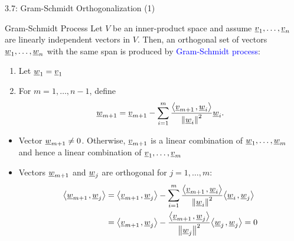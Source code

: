 \documentclass[10pt,english,aspectratio=169]{beamer}
\begin{document}
\begin{frame}{3.7: Gram-Schmidt Orthogonalization (1)}

\vspace{-2mm}

\begin{block}{Gram-Schmidt Process}
Let $V$ be an inner-product space and assume $\underline{v}_1, \ldots, \underline{v}_n$ are linearly independent vectors in $V$.
Then, an orthogonal set of vectors $\underline{w}_1, \ldots, \underline{w}_n$ with the same span is produced by \textcolor{blue}{Gram-Schmidt process}:
\begin{enumerate}
\item Let $\underline{w}_1 = \underline{v}_1$

\item For $m=1,\ldots,n-1$, define \vspace{-4.5mm}
\begin{equation*}
\underline{w}_{m+1} = \underline{v}_{m+1} - \sum_{i=1}^m \frac{ {\left\langle  \underline{v}_{m+1}  \mskip2mu ,  \underline{w}_i  \right\rangle} } { \left\| \underline{w}_i \right\|^2 } \underline{w}_i.
\end{equation*}
\end{enumerate}
\end{block}

\vspace{-0,5mm}
\begin{itemize}
\setlength\itemsep{1.5mm}
\item<2-> Vector $\underline{w}_{m+1} \neq 0$. Otherwise, $\underline{v}_{m+1}$ is a linear combination of $\underline{w}_1, \ldots, \underline{w}_m$ and hence a linear combination of $\underline{v}_1, \ldots, \underline{v}_m$

\item<3-> Vectors $\underline{w}_{m+1}$ and $\underline{w}_j$ are orthogonal for $j=1,\ldots,m$: \vspace{-1.5mm}
\begin{equation*}
\begin{split}
{\left\langle  \underline{w}_{m+1}  \mskip2mu ,  \underline{w}_j  \right\rangle}
&= {\left\langle  \underline{v}_{m+1}  \mskip2mu ,  \underline{w}_j  \right\rangle}
- \sum_{i=1}^m \frac{ {\left\langle  \underline{v}_{m+1}  \mskip2mu ,  \underline{w}_i  \right\rangle} } { \left\| \underline{w}_i \right\|^2 }
{\left\langle  \underline{w}_i  \mskip2mu ,  \underline{w}_j  \right\rangle} \\
&= {\left\langle  \underline{v}_{m+1}  \mskip2mu ,  \underline{w}_j  \right\rangle}
- \frac{ {\left\langle  \underline{v}_{m+1}  \mskip2mu ,  \underline{w}_j  \right\rangle} } { \left\| \underline{w}_j \right\|^2 }
{\left\langle  \underline{w}_j  \mskip2mu ,  \underline{w}_j  \right\rangle} = 0
\end{split}
\end{equation*}

\end{itemize}

\end{frame}
\end{document}

